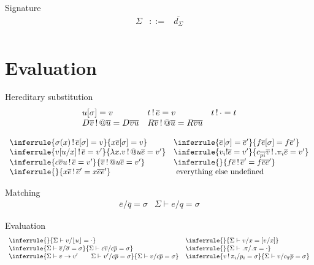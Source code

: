 \documentclass[acmlarge]{acmart}\settopmatter{}
\renewcommand{\|}{|}
\begin{document}
Signature
\[
\begin{array}{lcl}
\Sigma & ::= &  \overline{d_\Sigma} \\
\end{array}
\]


\section{Evaluation}
\label{sec:evaluation}

Hereditary substitution
\[
\begin{array}{lll}
u[\sigma] = v & t \,!\, \overline{e} = v & t \,!\, \cdot = t \\
D \overline{v} \,!\, @ \overline{u} = D \overline{v} \overline{u}
& R \overline{v} \,!\, @ \overline{u} = R \overline{v} \overline{u}
\end{array}
\]

\[
\begin{array}{ll}
\inferrule{\sigma(x) \bang \overline{e}[\sigma] = v}
{x \overline{e}[\sigma] = v}
&
\inferrule{\overline{e}[\sigma] = \overline{e}'}
{f \overline{e}[\sigma] = f \overline{e}'}
\\
\inferrule{ v[u/x] \bang \overline{e} = v'}
{\lambda x.v \bang @u \overline{e} = v'}
&
\inferrule{v_i ! \overline{e} = v'}
{c_{\overline{pi}} \overline{v} \bang .\pi_i \overline{e} = v'}
\\
\inferrule{c \overline{v} u \bang \overline{e} = v'}
{\overline{v} \bang @u \overline{e} = v'}
&
\inferrule{}
{f \overline{e} \bang \overline{e}' = f \overline{e} \overline{e}'}
\\
\inferrule{}
{x \overline{e} \bang \overline{e}' = x \overline{e} \overline{e}'}
&
\text{ everything else undefined }
\end{array}
\]



Matching
\[
\begin{array}{ll}
\overline{e}/\overline{q} = \sigma  & 
\Sigma \vdash e/q = \sigma
\end{array}
\]

Evaluation
\[
\begin{array}{ll}
\inferrule{}
{\Sigma \vdash v/\lfloor u \rfloor = \cdot} %
& 
\inferrule{}
{\Sigma \vdash v/x = [v/x]} %
\\
\inferrule{\Sigma \vdash \overline{v}/\overline{\sigma} = \sigma}
{\Sigma \vdash c\overline{v}/c\overline{p} = \sigma}  %
&
\inferrule{}
{\Sigma \vdash .\pi/.\pi = \cdot} %
\\
\inferrule{\Sigma \vdash v \to v' \qquad \Sigma \vdash v'/c\overline{p} = \sigma} 
{\Sigma \vdash v / c \overline{p} = \sigma} %
& 
\inferrule{v \bang \pi_i / p_i = \sigma}
{\Sigma \vdash v / c_{\overline \pi} \overline{p} = \sigma} %
\end{array}
\]
\end{document}
